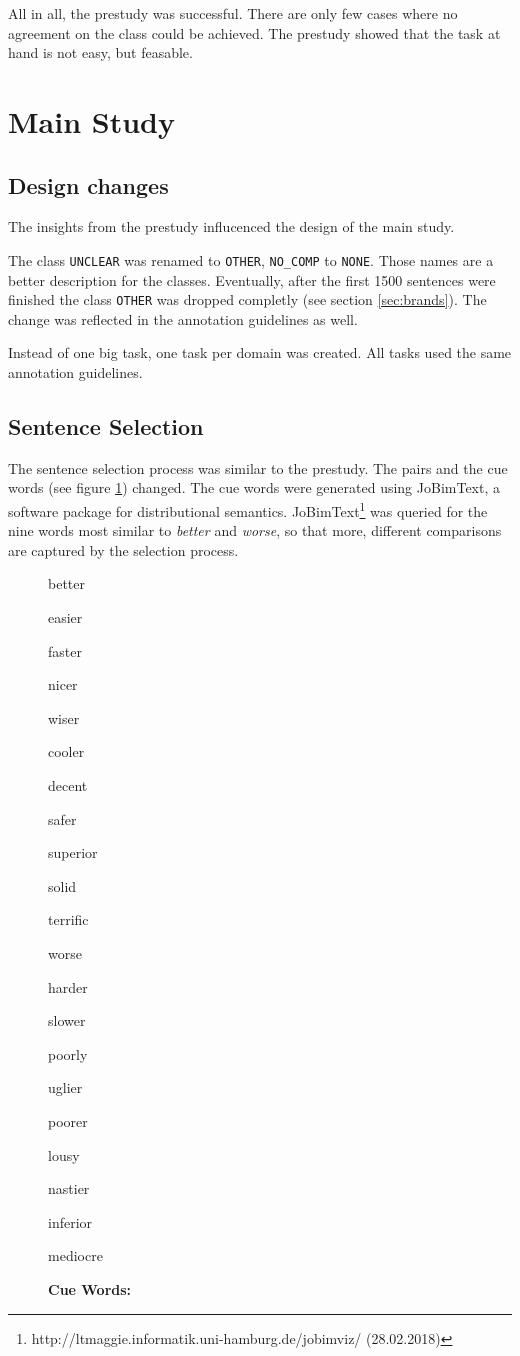 All in all, the prestudy was successful. There are only few cases where no agreement on the class could be achieved. The prestudy showed that the task at hand is not easy, but feasable.

\newpage
\section{Main Study}
\label{sec:mainstudy}
\subsection{Design changes}
\label{sec:designchanges}
The insights from the prestudy influcenced the design of the main study.

The class \texttt{UNCLEAR} was renamed to \texttt{OTHER}, \texttt{NO\_COMP} to \texttt{NONE}. Those names are a better description for the classes. Eventually, after the first 1500 sentences were finished the class \texttt{OTHER} was dropped completly (see section \ref{sec:brands}). The change was reflected in the annotation guidelines as well. 

Instead of one big task, one task per domain was created. All tasks used the same annotation guidelines.


\subsection{Sentence Selection}
The sentence selection process was similar to the prestudy. The pairs and the cue words (see figure \ref{fig:cue_words}) changed. The cue words were generated using JoBimText, a software package for distributional semantics. JoBimText\footnote{http://ltmaggie.informatik.uni-hamburg.de/jobimviz/ (28.02.2018)} was queried for the nine words most similar to \emph{better} and \emph{worse}, so that more, different comparisons are captured by the selection process.

\begin{figure}[h]
\centering
\caption{\textbf{Cue Words:} }
\label{fig:cue_words}
\begin{multicols}{4}
better

easier

faster

nicer

wiser

cooler

decent

safer

superior

solid

terrific

worse

harder

slower

poorly

uglier

poorer

lousy

nastier

inferior

mediocre
\end{multicols}
\end{figure}

